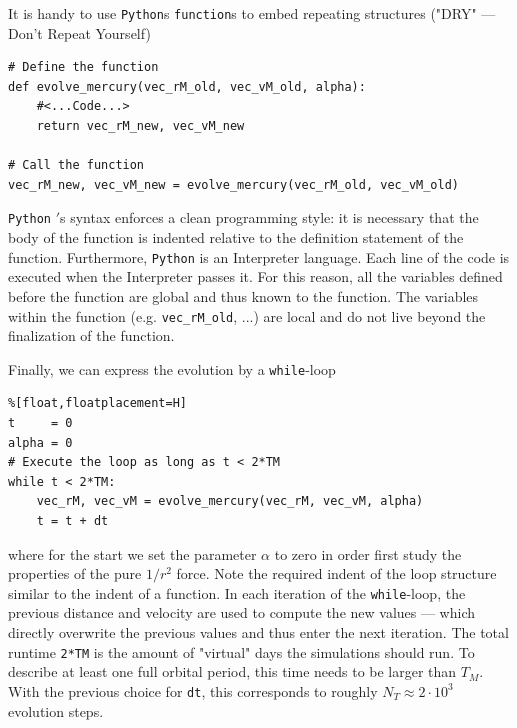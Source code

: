 \documentclass[12pt, UK english]{iopart}
\newcommand{\python}[0]{\texttt{Python} }
\begin{document}
It is handy to use \texttt{Python}s \texttt{function}s to embed repeating structures ("DRY" --- Don't Repeat Yourself)
\begin{lstlisting}
# Define the function
def evolve_mercury(vec_rM_old, vec_vM_old, alpha):
	#<...Code...>
	return vec_rM_new, vec_vM_new

# Call the function
vec_rM_new, vec_vM_new = evolve_mercury(vec_rM_old, vec_vM_old)
\end{lstlisting}
\python{$\!'$}s syntax enforces a clean programming style: it is necessary that the body of the function is indented relative to the definition statement of the function.
Furthermore, \python is an Interpreter language.
Each line of the code is executed when the Interpreter passes it.
For this reason, all the variables defined before the function are global and thus known to the function.
The variables within the function (e.g. \texttt{vec\_rM\_old}, ...) are local and do not live beyond the finalization of the function.

Finally, we can express the evolution by a \texttt{while}-loop
\begin{lstlisting}%[float,floatplacement=H]
t     = 0
alpha = 0
# Execute the loop as long as t < 2*TM
while t < 2*TM:
	vec_rM, vec_vM = evolve_mercury(vec_rM, vec_vM, alpha)
	t = t + dt
\end{lstlisting}
where for the start we set the parameter $\alpha$ to zero in order first study the properties of the pure 
$1/r^2$ force.
Note the required indent of the loop structure similar to the indent of a function.
In each iteration of the \texttt{while}-loop, the previous distance and velocity are used to compute the new values --- which directly overwrite the previous values and thus enter the next iteration.
The total runtime \texttt{2*TM} is the amount of "virtual" days the simulations should run.
To describe at least one full orbital period, this time needs to be larger than $T_M$.
With the previous choice for \texttt{dt}, this corresponds to roughly $N_T \approx 2 \cdot 10^3$ evolution steps.


\end{document}
